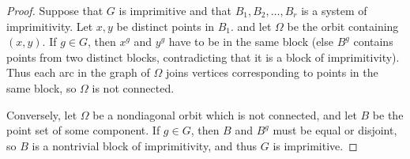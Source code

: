 \begin{proof}
	
	Suppose that $G$ is imprimitive and that $B_1,B_2,\dots,B_r$ is a system of imprimitivity.  Let $x,y$ be distinct points in $B_1$. and let $\Omega$ be the orbit containing $(x,y)$.  If $g\in G$, then $x^g$ and $y^g$ have to be in the same block (else $B^g$ contains points from two distinct blocks, contradicting that it is a block of imprimitivity).  Thus each arc in the graph of $\Omega$ joins vertices corresponding to points in the same block, so $\Omega$ is not connected.
	
	Conversely, let $\Omega$ be a nondiagonal orbit which is not connected, and let $B$ be the point set of some component.  If $g\in G$, then $B$ and $B^g$ must be equal or disjoint, so $B$ is a nontrivial block of imprimitivity, and thus $G$ is imprimitive.
	
	
\end{proof}


\ifdraft


\fi

